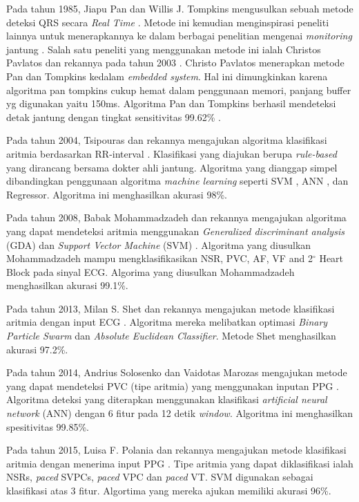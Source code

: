Pada tahun 1985, Jiapu Pan dan Willis J. Tompkins mengusulkan sebuah metode deteksi QRS secara \textit{Real Time} \cite{pantom}. Metode ini kemudian menginspirasi peneliti lainnya untuk menerapkannya ke dalam berbagai penelitian mengenai \textit{monitoring} jantung \cite{pantom_hardware}\cite{pantom_hardware2}. Salah satu peneliti yang menggunakan metode ini ialah Christos Pavlatos dan rekannya pada tahun 2003 \cite{pantom_hardware}. Christo Pavlatos menerapkan metode Pan dan Tompkins kedalam \textit{embedded system}. Hal ini dimungkinkan karena algoritma pan tompkins cukup hemat dalam penggunaan memori, panjang buffer yg digunakan yaitu 150ms. Algoritma Pan dan Tompkins berhasil mendeteksi detak jantung dengan tingkat sensitivitas 99.62\% \cite{pantom}.

Pada tahun 2004, Tsipouras dan rekannya mengajukan algoritma klasifikasi aritmia berdasarkan RR-interval \cite{rr_classification}. Klasifikasi yang diajukan berupa \textit{rule-based} yang dirancang bersama dokter ahli jantung. Algoritma yang dianggap simpel dibandingkan penggunaan algoritma \textit{machine learning} seperti SVM \cite{aritmia_svm}, ANN \cite{aritmia_ann}, dan Regressor. Algoritma ini menghasilkan akurasi 98\%.

Pada tahun 2008, Babak Mohammadzadeh dan rekannya mengajukan algoritma yang dapat mendeteksi aritmia menggunakan \textit{Generalized discriminant analysis} (GDA) dan \textit{Support Vector Machine} (SVM) \cite{aritmia_svm}. Algoritma yang diusulkan Mohammadzadeh mampu mengklasifikasikan NSR, PVC, AF, VF and 2$^{\circ}$ Heart Block pada sinyal ECG. Algorima yang diusulkan Mohammadzadeh menghasilkan akurasi 99.1\%.

Pada tahun 2013, Milan S. Shet dan rekannya mengajukan metode klasifikasi aritmia dengan input ECG \cite{aritmia_swarm}. Algoritma mereka melibatkan optimasi \textit{Binary Particle Swarm} dan \textit{Absolute Euclidean Classifier}. Metode Shet menghasilkan akurasi 97.2\%.

Pada tahun 2014, Andrius Solosenko dan Vaidotas Marozas mengajukan metode yang dapat mendeteksi PVC (tipe aritmia) yang menggunakan inputan PPG \cite{aritmia_ann}. Algoritma deteksi yang diterapkan menggunakan klasifikasi \textit{artificial neural network} (ANN) dengan 6 fitur pada 12 detik \textit{window}. Algoritma ini menghasilkan spesitivitas 99.85\%.

Pada tahun 2015, Luisa F. Polania dan rekannya mengajukan metode klasifikasi aritmia dengan menerima input PPG \cite{aritmia_svm_ppg}. Tipe aritmia yang dapat diklasifikasi ialah NSRs, \textit{paced} SVPCs, \textit{paced} VPC dan \textit{paced} VT. SVM digunakan sebagai klasifikasi atas 3 fitur. Algortima yang mereka ajukan memiliki akurasi 96\%.

